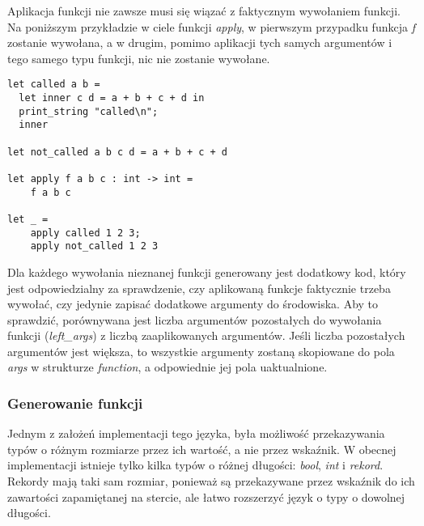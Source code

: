 \documentclass[declaration,shortabstract]{iithesis}
\begin{document}
Aplikacja funkcji nie zawsze musi się wiązać z faktycznym wywołaniem funkcji.
Na poniższym przykładzie w ciele funkcji \textit{apply},
w pierwszym przypadku funkcja \textit{f} zostanie wywołana, 
a w drugim, pomimo aplikacji tych samych argumentów i tego samego typu 
funkcji, nic nie zostanie wywołane.
\begin{lstlisting}[frame=single, caption={To czy funkcja zostanie wywołana,
nie jest wiadome w czasie kompilacj. OCaml.}]
let called a b = 
  let inner c d = a + b + c + d in 
  print_string "called\n";
  inner 

let not_called a b c d = a + b + c + d 

let apply f a b c : int -> int = 
    f a b c 

let _ = 
    apply called 1 2 3;
    apply not_called 1 2 3
\end{lstlisting}

Dla każdego wywołania nieznanej funkcji generowany jest dodatkowy \newline
kod, który jest odpowiedzialny za sprawdzenie, czy aplikowaną funkcje 
faktycznie trzeba wywołać, czy jedynie zapisać dodatkowe argumenty do 
środowiska. Aby to sprawdzić, porównywana jest liczba argumentów pozostałych do 
wywołania funkcji (\textit{left\_args}) z liczbą zaaplikowanych argumentów.
Jeśli liczba pozostałych argumentów jest większa, to wszystkie argumenty 
zostaną skopiowane do pola \textit{args} w strukturze \textit{function}, a 
odpowiednie jej pola uaktualnione.










\subsubsection{Generowanie funkcji}

Jednym z założeń implementacji tego języka, była możliwość przekazywania typów
o różnym rozmiarze przez ich wartość, a nie przez wskaźnik. W obecnej 
implementacji istnieje tylko kilka typów o różnej długości: \textit{bool},
\textit{int} i \textit{rekord}. Rekordy mają taki sam rozmiar, ponieważ są 
przekazywane przez wskaźnik do ich zawartości zapamiętanej na stercie, ale 
łatwo rozszerzyć język o typy o dowolnej długości. 
\end{document}
